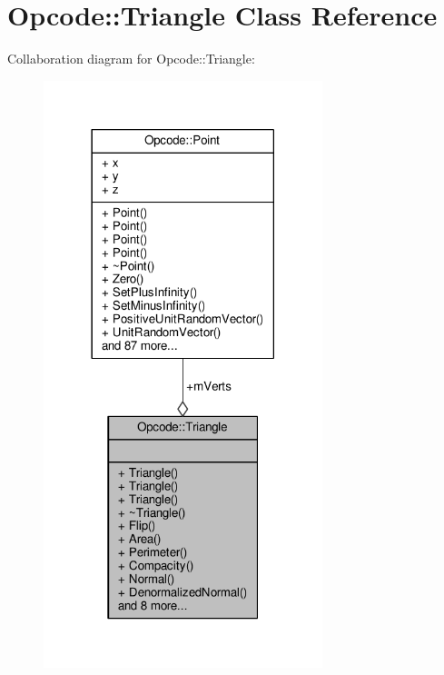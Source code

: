 \hypertarget{classOpcode_1_1Triangle}{}\section{Opcode\+:\+:Triangle Class Reference}
\label{classOpcode_1_1Triangle}


Collaboration diagram for Opcode\+:\+:Triangle\+:
\nopagebreak
\begin{figure}[H]
\begin{center}
\leavevmode
\includegraphics[width=230pt]{d0/d04/classOpcode_1_1Triangle__coll__graph}
\end{center}
\end{figure}

